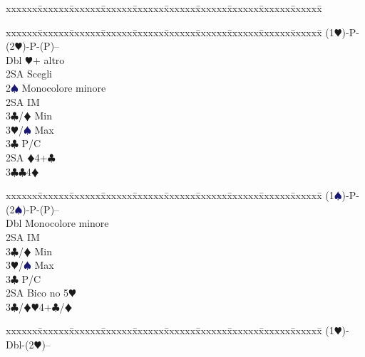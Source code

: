 \documentclass[a4paper,italian]{article}
\newcommand{\BC}{\textcolor{OliveGreen}{$\clubsuit$}}
\newcommand{\BD}{\textcolor{RedOrange}{$\vardiamondsuit$}}
\newcommand{\BH}{\textcolor{Red2}{$\varheartsuit${}}}
\newcommand{\BS}{\textcolor{MidnightBlue}{$\spadesuit${}}}
\newenvironment{bidtable}
{\begin{tabbing}

    xxxxxx\=xxxxxx\=xxxxxx\=xxxxxx\=xxxxxx\=xxxxxx\=xxxxxx\=xxxxxx\=xxxxxx\=xxxxxx\=\kill}
{\end{tabbing} }%
\begin{document}
\begin{multicols}{2}
\begin{bidtable}
                                        \end{bidtable}
                                        \columnbreak
                                        \begin{bidtable}
                                            (1\BH)-P-(2\BH)-P-(P)--\\
                                            Dbl \BH + altro\\
                                            \>2SA Scegli\\
                                            2\BS \> Monocolore minore\+\\
                                            2SA \> IM\+\\
                                            3\BC/\BD \> Min\\
                                            3\BH/\BS \> Max\-\\
                                            3\BC \> P/C\-\\
                                            2SA \BD 4+\BC \\
                                            3\BC {}\BC 4\BD
                                        \end{bidtable}
                                        \bigbreak
                                        \begin{bidtable}
                                            (1\BS)-P-(2\BS)-P-(P)--\\
                                            Dbl \> Monocolore minore\+\\
                                            2SA \> IM\+\\
                                            3\BC/\BD \> Min\\
                                            3\BH/\BS \> Max\-\\
                                            3\BC \> P/C\-\\
                                            2SA \> Bico no 5\BH \\
                                            3\BC/\BD {}\BH 4+\BC /\BD
                                        \end{bidtable}
                                        \bigbreak
                                        \begin{bidtable}
                                            (1\BH)-Dbl-(2\BH)--\\

\end{bidtable}
\end{multicols}
\end{document}
